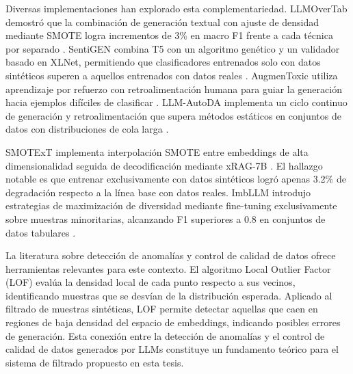 Diversas implementaciones han explorado esta complementariedad. LLMOverTab demostró que la combinación de generación textual con ajuste de densidad mediante SMOTE logra incrementos de 3\% en macro F1 frente a cada técnica por separado \cite{isomura2025llmovertab}. SentiGEN combina T5 con un algoritmo genético y un validador basado en XLNet, permitiendo que clasificadores entrenados solo con datos sintéticos superen a aquellos entrenados con datos reales \cite{sundararajan2023sentigen}. AugmenToxic utiliza aprendizaje por refuerzo con retroalimentación humana para guiar la generación hacia ejemplos difíciles de clasificar \cite{bodaghi2024augmentoxic}. LLM-AutoDA implementa un ciclo continuo de generación y retroalimentación que supera métodos estáticos en conjuntos de datos con distribuciones de cola larga \cite{wang2023llm}.

SMOTExT implementa interpolación SMOTE entre embeddings de alta dimensionalidad seguida de decodificación mediante xRAG-7B \cite{smotext2025arxiv}. El hallazgo notable es que entrenar exclusivamente con datos sintéticos logró apenas 3.2\% de degradación respecto a la línea base con datos reales. ImbLLM introdujo estrategias de maximización de diversidad mediante fine-tuning exclusivamente sobre muestras minoritarias, alcanzando F1 superiores a 0.8 en conjuntos de datos tabulares \cite{imbllm2024arxiv}.

La literatura sobre detección de anomalías y control de calidad de datos ofrece herramientas relevantes para este contexto. El algoritmo Local Outlier Factor (LOF) \cite{breunig2000lof} evalúa la densidad local de cada punto respecto a sus vecinos, identificando muestras que se desvían de la distribución esperada. Aplicado al filtrado de muestras sintéticas, LOF permite detectar aquellas que caen en regiones de baja densidad del espacio de embeddings, indicando posibles errores de generación. Esta conexión entre la detección de anomalías y el control de calidad de datos generados por LLMs constituye un fundamento teórico para el sistema de filtrado propuesto en esta tesis.

